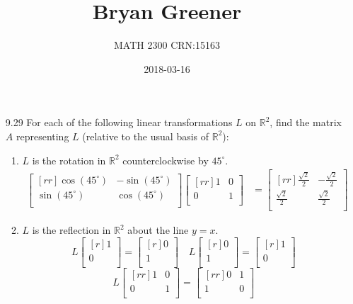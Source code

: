 \documentclass[12pt]{article}
\title{Bryan Greener}
\author{MATH 2300 CRN:15163}
\date{2018-03-16}
\theoremstyle{definition}
\theoremstyle{plain}
\begin{document}
\maketitle

\TabPositions{4cm}

\begin{enumerate}
\item[9.29]For each of the following linear transformations $L$ on $\mathbb{R}^2$, find the matrix $A$ representing $L$ (relative to the usual basis of $\mathbb{R}^2$):
	\begin{enumerate}
	\item $L$ is the rotation in $\mathbb{R}^2$ counterclockwise by $45^\circ$.
		\begin{align*}
		\begin{bmatrix}[rr]\cos(45^\circ)&-\sin(45^\circ)\\\sin(45^\circ)&\cos(45^\circ)\\\end{bmatrix}\begin{bmatrix}[rr]1&0\\0&1\\\end{bmatrix} &= \begin{bmatrix}[rr]\frac{\sqrt{2}}{2}&-\frac{\sqrt{2}}{2}\\\frac{\sqrt{2}}{2}&\frac{\sqrt{2}}{2}\\\end{bmatrix}
		\end{align*}
	\item $L$ is the reflection in $\mathbb{R}^2$ about the line $y=x$.
		\[ L\begin{bmatrix}[r]1\\0\\\end{bmatrix} = \begin{bmatrix}[r]0\\1\\\end{bmatrix} \quad L\begin{bmatrix}[r]0\\1\\\end{bmatrix} = \begin{bmatrix}[r]1\\0\\\end{bmatrix} \]
		\[ L\begin{bmatrix}[rr]1&0\\0&1\\\end{bmatrix} = \begin{bmatrix}[rr]0&1\\1&0\\\end{bmatrix} \]

\end{enumerate}
\end{enumerate}
\end{document}
